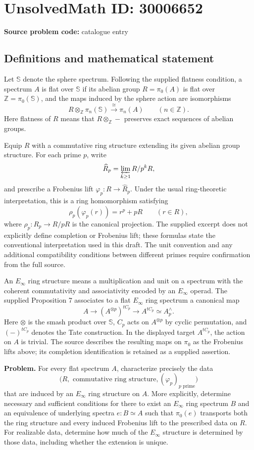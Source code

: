 \documentclass[11pt]{article}
\newcommand{\Z}{\mathbb{Z}}
\begin{document}
\section*{UnsolvedMath ID: 30006652}
\textbf{Source problem code:} catalogue entry
\subsection{Definitions and mathematical statement}
Let \(\mathbb S\) denote the sphere spectrum. Following the supplied flatness condition, a spectrum \(A\) is flat over \(\mathbb S\) if its abelian group \(R=\pi_0(A)\) is flat over \(\Z=\pi_0(\mathbb S)\), and the maps induced by the sphere action are isomorphisms
\[
R\otimes_{\Z}\pi_n(\mathbb S)\xrightarrow{\ \cong\ }\pi_n(A)
\qquad(n\in\Z).
\]
Here flatness of \(R\) means that \(R\otimes_{\Z}-\) preserves exact sequences of abelian groups.

Equip \(R\) with a commutative ring structure extending its given abelian group structure. For each prime \(p\), write
\[
\widehat R_p=\varprojlim_{k\geq1}R/p^kR,
\]
and prescribe a Frobenius lift \(\varphi_p:R\to\widehat R_p\). Under the usual ring-theoretic interpretation, this is a ring homomorphism satisfying
\[
\rho_p(\varphi_p(r))=r^p+pR
\qquad(r\in R),
\]
where \(\rho_p:\widehat R_p\to R/pR\) is the canonical projection. The supplied excerpt does not explicitly define completion or Frobenius lift; these formulas state the conventional interpretation used in this draft. The unit convention and any additional compatibility conditions between different primes require confirmation from the full source.

An \(E_\infty\) ring structure means a multiplication and unit on a spectrum with the coherent commutativity and associativity encoded by an \(E_\infty\) operad. The supplied Proposition 7 associates to a flat \(E_\infty\) ring spectrum a canonical map
\[
A\longrightarrow (A^{\otimes p})^{tC_p}
\longrightarrow A^{tC_p}\simeq A_p^{\wedge}.
\]
Here \(\otimes\) is the smash product over \(\mathbb S\), \(C_p\) acts on \(A^{\otimes p}\) by cyclic permutation, and \((-)^{tC_p}\) denotes the Tate construction. In the displayed target \(A^{tC_p}\), the action on \(A\) is trivial. The source describes the resulting maps on \(\pi_0\) as the Frobenius lifts above; its completion identification is retained as a supplied assertion.

\textbf{Problem.} For every flat spectrum \(A\), characterize precisely the data
\[
\bigl(R,\text{ commutative ring structure},(\varphi_p)_{p\text{ prime}}\bigr)
\]
that are induced by an \(E_\infty\) ring structure on \(A\). More explicitly, determine necessary and sufficient conditions for there to exist an \(E_\infty\) ring spectrum \(B\) and an equivalence of underlying spectra \(e:B\simeq A\) such that \(\pi_0(e)\) transports both the ring structure and every induced Frobenius lift to the prescribed data on \(R\). For realizable data, determine how much of the \(E_\infty\) structure is determined by those data, including whether the extension is unique.
\end{document}
